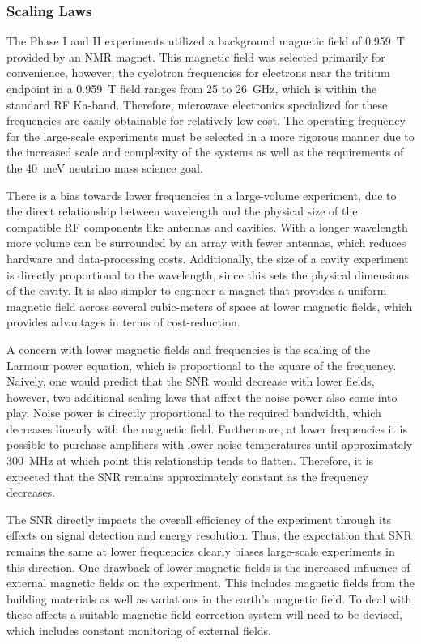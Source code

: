 \subsubsection*{Scaling Laws}

The Phase I and II experiments utilized a background magnetic field of 0.959~T provided by an NMR magnet. This magnetic field was selected primarily for convenience, however, the cyclotron frequencies for electrons near the tritium endpoint in a 0.959~T field ranges from 25 to 26~GHz, which is within the standard RF Ka-band. Therefore, microwave electronics specialized for these frequencies are easily obtainable for relatively low cost. The operating frequency for the large-scale experiments must be selected in a more rigorous manner due to the increased scale and complexity of the systems as well as the requirements of the 40~meV neutrino mass science goal.

There is a bias towards lower frequencies in a large-volume experiment, due to the direct relationship between wavelength and the physical size of the compatible RF components like antennas and cavities. With a longer wavelength more volume can be surrounded by an array with fewer antennas, which reduces hardware and data-processing costs. Additionally, the size of a cavity experiment is directly proportional to the wavelength, since this sets the physical dimensions of the cavity. It is also simpler to engineer a magnet that provides a uniform magnetic field across several cubic-meters of space at lower magnetic fields, which provides advantages in terms of cost-reduction.

A concern with lower magnetic fields and frequencies is the scaling of the Larmour power equation, which is proportional to the square of the frequency. Naively, one would predict that the SNR would decrease with lower fields, however, two additional scaling laws that affect the noise power also come into play. Noise power is directly proportional to the required bandwidth, which decreases linearly with the magnetic field. Furthermore, at lower frequencies it is possible to purchase amplifiers with lower noise temperatures until approximately 300~MHz at which point this relationship tends to flatten. Therefore, it is expected that the SNR remains approximately constant as the frequency decreases.

The SNR directly impacts the overall efficiency of the experiment through its effects on signal detection and energy resolution. Thus, the expectation that SNR remains the same at lower frequencies clearly biases large-scale experiments in this direction. One drawback of lower magnetic fields is the increased influence of external magnetic fields on the experiment. This includes magnetic fields from the building materials as well as variations in the earth's magnetic field. To deal with these affects a suitable magnetic field correction system will need to be devised, which includes constant monitoring of external fields.

